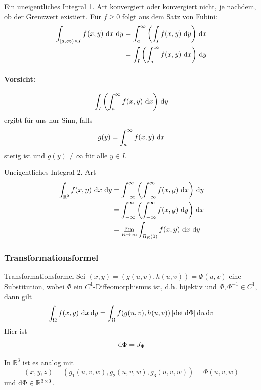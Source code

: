 \documentclass[a4paper,10pt]{article}
\def\R{\mathbb{R}}
\begin{document}
Ein uneigentliches Integral 1. Art konvergiert oder konvergiert nicht, je nachdem, ob der Grenzwert existiert. Für \( f \geq 0 \) folgt aus dem Satz von Fubini:
\begin{align*}
    \int_{[a, \infty) \times I} f(x, y) \, \odif{x} \, \odif{y} &= \int_a^\infty \left( \int_I f(x, y) \, \odif{y} \right) \, \odif{x} \\
    &= \int_I \left( \int_a^\infty f(x, y) \, \odif{x} \right) \, \odif{y}
\end{align*}
\paragraph{Vorsicht:} \[
    \int_I \left( \int_a^\infty f(x, y) \, \odif{x} \right) \, \odif{y}
\] ergibt für uns nur Sinn, falls \[
    g(y) = \int_a^\infty f(x, y) \, \odif{x}
\] stetig ist und \( g(y) \neq \infty \) für alle \( y \in I \).

\begin{subbox}{Uneigentliches Integral 2. Art}
\begin{align*}
    \int_{\R^2} f(x, y) \, \odif{x} \, \odif{y} &= \int_{-\infty}^\infty \left( \int_{-\infty}^\infty f(x, y) \, \odif{x} \right) \, \odif{y} \\
    &= \int_{-\infty}^\infty \left( \int_{-\infty}^\infty f(x, y) \, \odif{y} \right) \, \odif{x} \\
    &= \lim_{R \to \infty} \int_{B_R(0)} f(x, y) \, \odif{x} \, \odif{y}
\end{align*}
\end{subbox}


\subsubsection{Transformationsformel}

\begin{mainbox}{Transformationsformel}
    Sei \( (x, y) = (g(u, v), h(u, v)) = \Phi(u, v) \) eine Substitution, wobei \( \Phi \) ein \( C^1 \)-Diffeomorphismus ist, d.h. bijektiv und \( \Phi, \Phi^{-1} \in C^1 \), dann gilt
    \[
        \int_\Omega f(x, y) \, \odif{x,y} = \int_{\hat{\Omega}} f(g(u, v), h(u, v)) \left| \det \odif{\Phi} \right| \odif{u, v}
    \]
    Hier ist
    \[
        \odif{\Phi} = J_\Phi
    \]
\end{mainbox}

In \( \R^3 \) ist es analog mit \[ (x, y, z) = (g_1(u, v, w), g_2(u, v, w), g_3(u, v, w)) = \Phi(u, v, w) \] und \( \odif{\Phi} \in \R^{3 \times 3} \).
\end{document}
